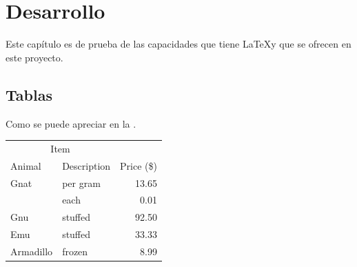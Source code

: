 
\chapter{Desarrollo}

Este capítulo es de prueba de las capacidades que tiene \LaTeX y que se ofrecen en este proyecto.

\section{Tablas}

Como se puede apreciar en la .


\begin{table}[htb]
	\centering
	\begin{tabular}{@{}llr@{}} \toprule
		\multicolumn{2}{c}{Item} \\ \cmidrule(r){1-2}
		Animal & Description & Price (\$)\\ \midrule
		Gnat & per gram & 13.65 \\
		& each & 0.01 \\
		Gnu & stuffed & 92.50 \\
		Emu & stuffed & 33.33 \\
		Armadillo & frozen & 8.99 \\ \bottomrule
	\end{tabular}
\end{table}

%	

